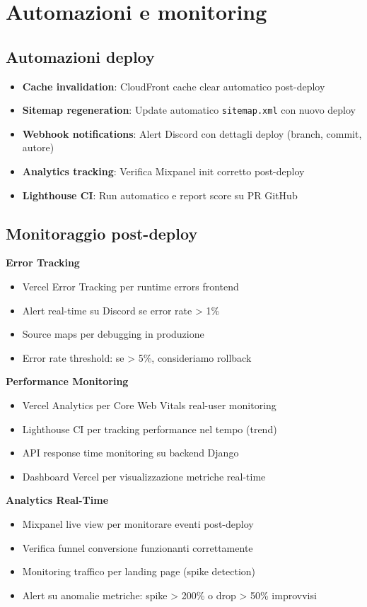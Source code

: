 \section{Automazioni e monitoring}

\subsection{Automazioni deploy}
\begin{itemize}
  \item \textbf{Cache invalidation}: CloudFront cache clear automatico 
        post-deploy
  \item \textbf{Sitemap regeneration}: Update automatico 
        \texttt{sitemap.xml} con nuovo deploy
  \item \textbf{Webhook notifications}: Alert Discord con dettagli deploy 
        (branch, commit, autore)
  \item \textbf{Analytics tracking}: Verifica Mixpanel init corretto 
        post-deploy
  \item \textbf{Lighthouse CI}: Run automatico e report score su PR GitHub
\end{itemize}

\subsection{Monitoraggio post-deploy}
\textbf{Error Tracking}
\begin{itemize}
  \item Vercel Error Tracking per runtime errors frontend
  \item Alert real-time su Discord se error rate > 1\%
  \item Source maps per debugging in produzione
  \item Error rate threshold: se > 5\%, consideriamo rollback
\end{itemize}

\textbf{Performance Monitoring}
\begin{itemize}
  \item Vercel Analytics per Core Web Vitals real-user monitoring
  \item Lighthouse CI per tracking performance nel tempo (trend)
  \item API response time monitoring su backend Django
  \item Dashboard Vercel per visualizzazione metriche real-time
\end{itemize}

\textbf{Analytics Real-Time}
\begin{itemize}
  \item Mixpanel live view per monitorare eventi post-deploy
  \item Verifica funnel conversione funzionanti correttamente
  \item Monitoring traffico per landing page (spike detection)
  \item Alert su anomalie metriche: spike > 200\% o drop > 50\% 
        improvvisi
\end{itemize}

